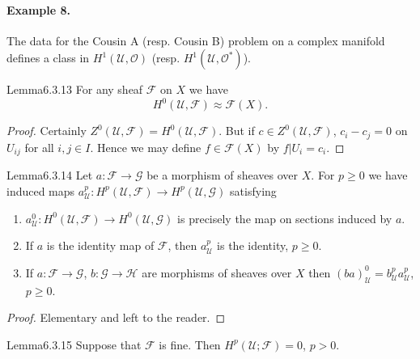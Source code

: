 \paragraph{Example 8.} The data for the Cousin A (resp. Cousin B) problem on a complex manifold defines a class in $H^1(\mathcal U,\mathcal O)$ (resp. $H^1(\mathcal U,\mathcal O^*)$).
\begin{originaltheorem}{Lemma}{6.3.13}
For any sheaf $\mathcal F$ on $X$ we have
\[
H^0(\mathcal U,\mathcal F)\approx\mathcal F(X).
\]
\end{originaltheorem}
\begin{proof}
Certainly $Z^0(\mathcal U,\mathcal F)=H^0(\mathcal U,\mathcal F)$. But if $c\in Z^0(\mathcal U,\mathcal F)$, $c_i-c_j=0$ on $U_{ij}$ for all $i,j\in I$. Hence we may define $f\in\mathcal F(X)$ by $f|U_i=c_i$.
\end{proof}
\begin{originaltheorem}{Lemma}{6.3.14}
Let $a:\mathcal F\to\mathcal G$ be a morphism of sheaves over $X$. For $p\geq0$ we have induced maps $a_{\mathcal U}^p:H^p(\mathcal U,\mathcal F)\to H^p(\mathcal U,\mathcal G)$ satisfying
\begin{enumerate}[label=\Alph*.]
\item $a_{\mathcal U}^0:H^0(\mathcal U,\mathcal F)\to H^0(\mathcal U,\mathcal G)$ is precisely the map on sections induced by $a$.
\item If $a$ is the identity map of $\mathcal F$, then $a_{\mathcal U}^p$ is the identity, $p\geq0$.
\item If $a:\mathcal F\to\mathcal G$, $b:\mathcal G\to\mathcal H$ are morphisms of sheaves over $X$ then $(ba)_{\mathcal U}^0=b_{\mathcal U}^pa_{\mathcal U}^p$, $p\geq0$.
\end{enumerate}
\end{originaltheorem}
\begin{proof}
Elementary and left to the reader.
\end{proof}
\begin{originaltheorem}{Lemma}{6.3.15}
Suppose that $\mathcal F$ is fine. Then $H^p(\mathcal U;\mathcal F)=0$, $p>0$.
\end{originaltheorem}
